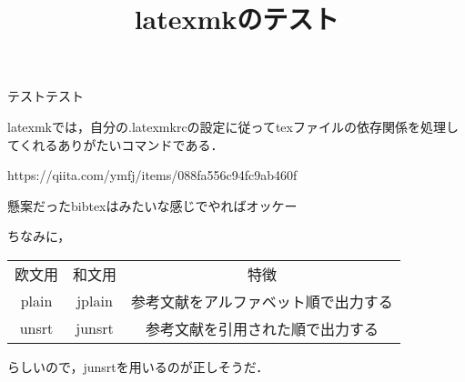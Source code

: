 \documentclass[a4j]{jarticle}
\title{latexmkのテスト}
\begin{document}
テストテスト

latexmkでは，自分の.latexmkrcの設定に従ってtexファイルの依存関係を処理してくれるありがたいコマンドである．

https://qiita.com/ymfj/items/088fa556c94fc9ab460f

懸案だったbibtexは\cite{Devreese_2009}みたいな感じでやればオッケー

ちなみに，
\begin{table}[htb]
 \begin{tabular}{|c|c|c|}
  欧文用 &和文用	&特徴　\\
plain&	jplain&	参考文献をアルファベット順で出力する\\
unsrt&	junsrt&	参考文献を引用された順で出力する 
 \end{tabular}
\end{table}
らしいので，junsrtを用いるのが正しそうだ．


                                                                                 
                                                                               
\end{document}
